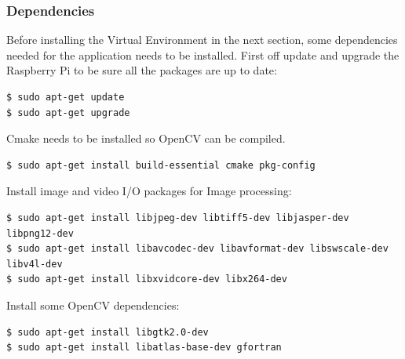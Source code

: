 \subsubsection{Dependencies}
Before installing the Virtual Environment in the next section, some dependencies needed for the application needs to be installed. First off update and upgrade the Raspberry Pi to be sure all the packages are up to date:
\begin{verbatim}
$ sudo apt-get update
$ sudo apt-get upgrade
\end{verbatim}
Cmake needs to be installed so OpenCV can be compiled.
\begin{verbatim}
$ sudo apt-get install build-essential cmake pkg-config
\end{verbatim}
Install image and video I/O packages for Image processing:
\begin{verbatim}
$ sudo apt-get install libjpeg-dev libtiff5-dev libjasper-dev libpng12-dev
$ sudo apt-get install libavcodec-dev libavformat-dev libswscale-dev libv4l-dev
$ sudo apt-get install libxvidcore-dev libx264-dev
\end{verbatim}
Install some OpenCV dependencies:
\begin{verbatim}
$ sudo apt-get install libgtk2.0-dev
$ sudo apt-get install libatlas-base-dev gfortran
\end{verbatim}


